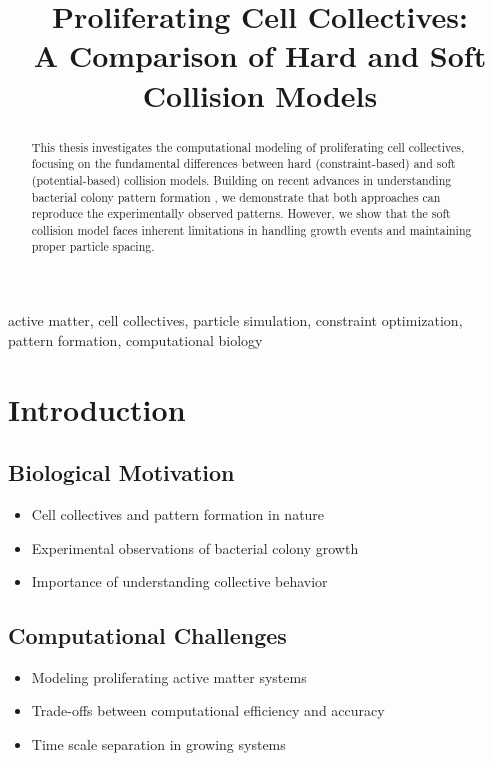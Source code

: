 \documentclass[conference]{IEEEtran}
\begin{document}
\title{Proliferating Cell Collectives: \\A Comparison of Hard and Soft Collision Models}

\author{
}

\maketitle

\begin{abstract}
    This thesis investigates the computational modeling of proliferating cell collectives, focusing on the fundamental differences between hard (constraint-based) and soft (potential-based) collision models. Building on recent advances in understanding bacterial colony pattern formation \cite{Weady2024}, we demonstrate that both approaches can reproduce the experimentally observed patterns. However, we show that the soft collision model faces inherent limitations in handling growth events and maintaining proper particle spacing.

\end{abstract}

\begin{IEEEkeywords}
    active matter, cell collectives, particle simulation, constraint optimization, pattern formation, computational biology
\end{IEEEkeywords}

\section{Introduction}
\subsection{Biological Motivation}
\begin{itemize}
    \item Cell collectives and pattern formation in nature
    \item Experimental observations of bacterial colony growth
    \item Importance of understanding collective behavior
\end{itemize}

\subsection{Computational Challenges}
\begin{itemize}
    \item Modeling proliferating active matter systems
    \item Trade-offs between computational efficiency and accuracy
    \item Time scale separation in growing systems
\end{itemize}
\end{document}
